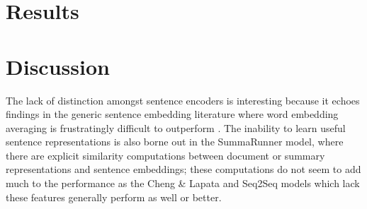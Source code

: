 \documentclass[11pt,a4paper]{article}
\newcommand{\hal}[1]{\textcolor{blue!50!red!70!white}{\textbf{[[Hal: #1]]}}}
\begin{document}
%
%

\section{Results}


\section{Discussion}
The lack of distinction amongst sentence encoders is interesting because 
it echoes findings in the generic sentence embedding literature 
where word embedding averaging is frustratingly difficult to 
outperform  \cite{wieting2015towards,arora2016simple,wieting2017revisiting}.
The inability to learn useful sentence representations is also 
borne out in the 
SummaRunner model, where there are explicit similarity computations
between document or summary representations and sentence embeddings;
these computations do not seem to add much to the performance as the 
Cheng \& Lapata and Seq2Seq models which lack these features generally
perform as well or better.
\end{document}
